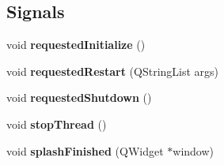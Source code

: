 \subsection*{Signals}
\begin{DoxyCompactItemize}
\item 
\mbox{\label{class_bitcoin_application_a1d523693dd9473db887a8dabea1fd6e5}} 
void {\bfseries requested\+Initialize} ()
\item 
\mbox{\label{class_bitcoin_application_a1bea4299d3c9ec6b063d1413aca9b738}} 
void {\bfseries requested\+Restart} (Q\+String\+List args)
\item 
\mbox{\label{class_bitcoin_application_aa18558117bf6e7ba458d0ce05f2ef6e6}} 
void {\bfseries requested\+Shutdown} ()
\item 
\mbox{\label{class_bitcoin_application_a7f117b69142316e07e0292a1b11f0768}} 
void {\bfseries stop\+Thread} ()
\item 
\mbox{\label{class_bitcoin_application_a2beb256cc754bcce12f6690e7e1c57db}} 
void {\bfseries splash\+Finished} (Q\+Widget $\ast$window)
\end{DoxyCompactItemize}
